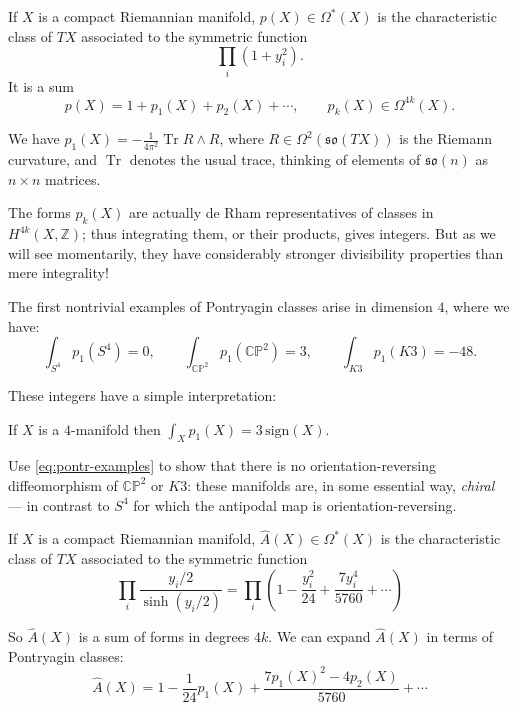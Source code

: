 \documentclass[12pt,letterpaper,reqno]{article}
\numberwithin{equation}{section}
\newcommand{\fso}{{\mathfrak {so}}}
\newcommand{\C}{\ensuremath{\mathbb C}}
\newcommand{\PP}{\ensuremath{\mathbb P}}
\newcommand{\Z}{\ensuremath{\mathbb Z}}
\newcommand{\ti}[1]{\textit{#1}}
\DeclareMathOperator{\Tr}{Tr}
\begin{document}
\begin{defn} If $X$ is a compact Riemannian manifold, $p(X) \in \Omega^*(X)$
is the characteristic class of $TX$ associated to the symmetric function
\begin{equation}
  \prod_i (1 + y_i^2).
\end{equation}
It is a sum
\begin{equation}
  p(X) = 1 + p_1(X) + p_2(X) + \cdots, \qquad p_k(X) \in \Omega^{4k}(X).
\end{equation}
\end{defn}

\begin{example}
We have $p_1(X) = -\frac{1}{4\pi^2} \Tr R \wedge R$, where
$R \in \Omega^2(\fso(TX))$ is the Riemann curvature, and $\Tr$ denotes
the usual trace, thinking of elements of $\fso(n)$ as $n \times n$ matrices.
\end{example}

The forms $p_k(X)$ are actually de Rham representatives of classes in $H^{4k}(X,\Z)$;
thus integrating them, or their products, gives integers.
But as we will see momentarily, they have considerably stronger 
divisibility properties than mere integrality!

\begin{example} The first nontrivial examples of Pontryagin classes arise in
dimension $4$, where we have:
\begin{equation} \label{eq:pontr-examples}
\int_{S^4} p_1(S^4) = 0, \qquad \int_{\C\PP^2} p_1(\C\PP^2) = 3, \qquad \int_{K3} p_1(K3) = -48.
\end{equation}
\end{example}
These integers have a simple interpretation:
\begin{thm} If $X$ is a $4$-manifold then $\int_X p_1(X) = 3 \, {\mathrm{sign}}(X)$.
\end{thm}

\begin{exercise} Use \eqref{eq:pontr-examples} to
show that there is no orientation-reversing diffeomorphism of $\C\PP^2$ or $K3$:
these manifolds are, in some essential way, \ti{chiral} --- in contrast to $S^4$
for which the antipodal map is orientation-reversing.
\end{exercise}

\begin{defn} \label{def:ahat} 
If $X$ is a compact Riemannian manifold, $\hat A(X) \in \Omega^*(X)$
is the characteristic class of $TX$ associated to the symmetric function
\begin{equation}
  \prod_i \frac{y_i/2}{\sinh(y_i/2)} = \prod_i \left( 1 - \frac{y_i^2}{24} + \frac{7 y_i^4}{5760} + \cdots \right)
\end{equation}
\end{defn}
So $\hat A(X)$ is a sum of forms in degrees $4k$.
We can expand $\hat A(X)$ in terms of Pontryagin classes:
\begin{equation}
  \hat A(X) = 1 - \frac{1}{24} p_1(X) + \frac{7 p_1(X)^2 - 4 p_2(X)}{5760} + \cdots
\end{equation}
\end{document}
